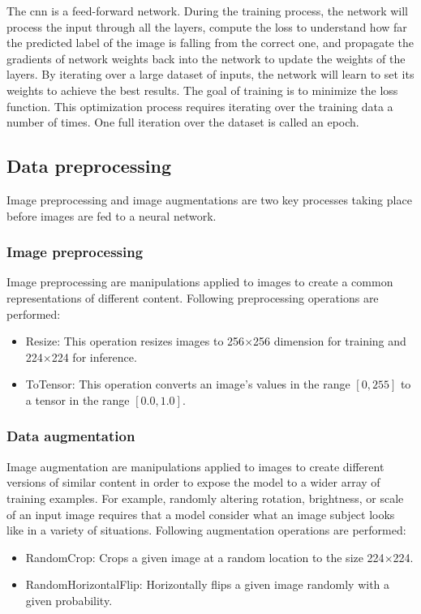 The \acrshort{cnn} is a feed-forward network. During the training process, the network will process the input through all the layers, compute the loss to understand how far the predicted label of the image is falling from the correct one, and propagate the gradients of network weights back into the network to update the weights of the layers. By iterating over a large dataset of inputs, the network will learn to set its weights to achieve the best results. The goal of training is to minimize the loss function. This optimization process requires iterating over the training data a number of times. One full iteration over the dataset is called an epoch.

\subsection{Data preprocessing}
Image preprocessing and image augmentations are two key processes taking place before images are fed to a neural network.

\subsubsection{Image preprocessing}
Image preprocessing are manipulations applied to images to create a common representations of different content. Following preprocessing operations are performed:
\begin{itemize}
    \item Resize: This operation resizes images to 256$\times$256 dimension for training and 224$\times$224 for inference.
    \item ToTensor: This operation converts an image's values in the range $[0, 255]$ to a tensor in the range $[0.0, 1.0]$.
\end{itemize}

\subsubsection{Data augmentation}
Image augmentation are manipulations applied to images to create different versions of similar content in order to expose the model to a wider array of training examples. For example, randomly altering rotation, brightness, or scale of an input image requires that a model consider what an image subject looks like in a variety of situations. Following augmentation operations are performed:
\begin{itemize}
    \item RandomCrop: Crops a given image at a random location to the size 224$\times$224.
    \item RandomHorizontalFlip: Horizontally flips a given image randomly with a given probability.
\end{itemize}


